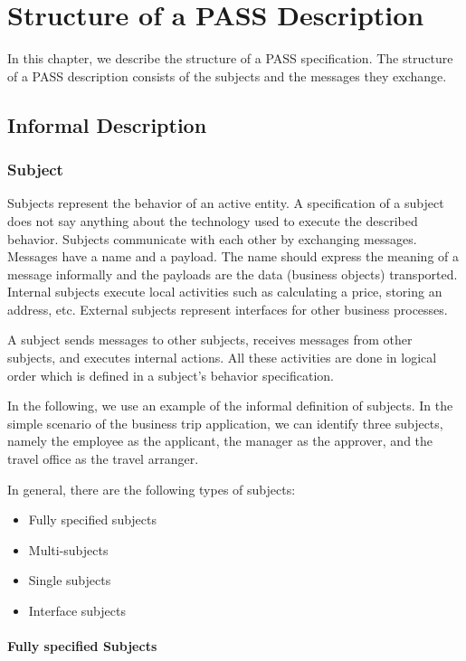 \chapter{Structure of a PASS Description}
\label{PASSStruct}

In this chapter, we describe the structure of a PASS specification. The structure of a PASS description consists of the subjects and the messages they exchange.

\section{Informal Description}
\subsection{Subject}
\label{sec: Subject}

Subjects represent the behavior of an active entity. A specification of a subject does not say anything about the technology used to execute the described behavior. Subjects communicate with each other by exchanging messages. Messages have a name and a payload. The name should express the meaning of a message informally and the payloads are the data (business objects) transported. Internal subjects execute local activities such as calculating a price, storing an address, etc. External subjects represent interfaces for other business processes.

A subject sends messages to other subjects, receives messages from other subjects, and executes internal actions. All these activities are done in logical order which is defined in a subject's behavior specification.

In the following, we use an example of the informal definition of subjects. In the simple scenario of the business trip application, we can identify three subjects, namely the employee as the applicant, the manager as the approver, and the travel office as the travel arranger.

In general, there are the following types of subjects:

\begin{itemize}
	\item Fully specified subjects
	\item Multi-subjects
	\item Single subjects
	\item Interface subjects 
\end{itemize}

\subsubsection{Fully specified Subjects}

